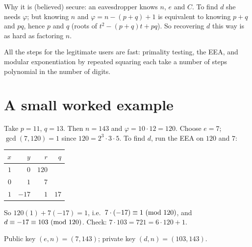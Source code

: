 Why it is (believed) secure: an eavesdropper knows $n$, $e$ and $C$. To find $d$ she needs
$\varphi$; but knowing $n$ and $\varphi = n - (p+q) + 1$ is equivalent to knowing $p + q$ and
$pq$, hence $p$ and $q$ (roots of $t^2 - (p+q)t + pq$). So recovering $d$ this way is as hard as
factoring $n$.

All the steps for the legitimate users are fast: primality testing, the EEA, and modular
exponentiation by repeated squaring each take a number of steps polynomial in the number of
digits.

\section{A small worked example}

\begin{example}
Take $p = 11$, $q = 13$. Then $n = 143$ and $\varphi = 10 \cdot 12 = 120$. Choose $e = 7$;
$\gcd(7, 120) = 1$ since $120 = 2^3\cdot 3\cdot 5$. To find $d$, run the EEA on $120$ and $7$:
\begin{center}
\begin{tabular}{rrrr}
\toprule
$x$ & $y$ & $r$ & $q$\\
\midrule
$1$ & $0$ & $120$ & \\
$0$ & $1$ & $7$ & \\
$1$ & $-17$ & $1$ & $17$\\
\bottomrule
\end{tabular}
\end{center}
So $120(1) + 7(-17) = 1$, i.e.\ $7\cdot(-17) \equiv 1 \ (\mathrm{mod}\ 120)$, and
$d \equiv -17 \equiv 103 \ (\mathrm{mod}\ 120)$. Check: $7 \cdot 103 = 721 = 6\cdot 120 + 1$.

Public key $(e,n) = (7, 143)$; private key $(d,n) = (103, 143)$.
\end{example}

